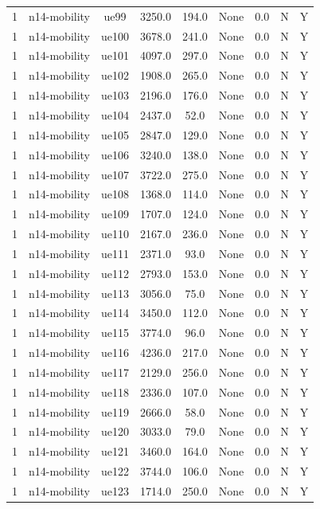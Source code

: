 \begin{table}[ht]
\begin{tabular}{|c|c|c|c|c|c|c|c|c|}
1 & n14-mobility & ue99 & 3250.0 & 194.0 & None & 0.0 & N & Y \\
1 & n14-mobility & ue100 & 3678.0 & 241.0 & None & 0.0 & N & Y \\
1 & n14-mobility & ue101 & 4097.0 & 297.0 & None & 0.0 & N & Y \\
1 & n14-mobility & ue102 & 1908.0 & 265.0 & None & 0.0 & N & Y \\
1 & n14-mobility & ue103 & 2196.0 & 176.0 & None & 0.0 & N & Y \\
1 & n14-mobility & ue104 & 2437.0 & 52.0 & None & 0.0 & N & Y \\
1 & n14-mobility & ue105 & 2847.0 & 129.0 & None & 0.0 & N & Y \\
1 & n14-mobility & ue106 & 3240.0 & 138.0 & None & 0.0 & N & Y \\
1 & n14-mobility & ue107 & 3722.0 & 275.0 & None & 0.0 & N & Y \\
1 & n14-mobility & ue108 & 1368.0 & 114.0 & None & 0.0 & N & Y \\
1 & n14-mobility & ue109 & 1707.0 & 124.0 & None & 0.0 & N & Y \\
1 & n14-mobility & ue110 & 2167.0 & 236.0 & None & 0.0 & N & Y \\
1 & n14-mobility & ue111 & 2371.0 & 93.0 & None & 0.0 & N & Y \\
1 & n14-mobility & ue112 & 2793.0 & 153.0 & None & 0.0 & N & Y \\
1 & n14-mobility & ue113 & 3056.0 & 75.0 & None & 0.0 & N & Y \\
1 & n14-mobility & ue114 & 3450.0 & 112.0 & None & 0.0 & N & Y \\
1 & n14-mobility & ue115 & 3774.0 & 96.0 & None & 0.0 & N & Y \\
1 & n14-mobility & ue116 & 4236.0 & 217.0 & None & 0.0 & N & Y \\
1 & n14-mobility & ue117 & 2129.0 & 256.0 & None & 0.0 & N & Y \\
1 & n14-mobility & ue118 & 2336.0 & 107.0 & None & 0.0 & N & Y \\
1 & n14-mobility & ue119 & 2666.0 & 58.0 & None & 0.0 & N & Y \\
1 & n14-mobility & ue120 & 3033.0 & 79.0 & None & 0.0 & N & Y \\
1 & n14-mobility & ue121 & 3460.0 & 164.0 & None & 0.0 & N & Y \\
1 & n14-mobility & ue122 & 3744.0 & 106.0 & None & 0.0 & N & Y \\
1 & n14-mobility & ue123 & 1714.0 & 250.0 & None & 0.0 & N & Y \\

\end{tabular}
\end{table}
